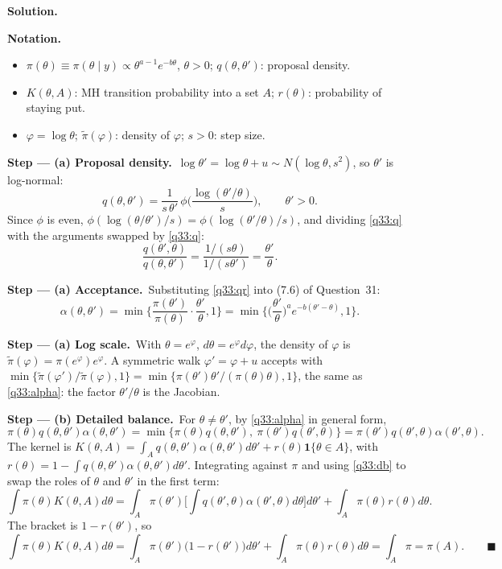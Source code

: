 \documentclass[11pt,a4paper]{article}
\numberwithin{equation}{questao}   %
\newenvironment{notacao}{\par\smallskip\noindent\textbf{Notation.}\begin{itemize}[leftmargin=1.4em,topsep=1pt,itemsep=0pt]\small}{\end{itemize}}
\newcommand{\passo}[2]{\par\smallskip\noindent\textbf{Step --- #1.}~#2}
\newcommand{\solhead}{\par\medskip\noindent{\color{blue!55!black}\rule{\linewidth}{0.3pt}}\par\noindent\textbf{Solution.}}
\newcommand{\1}{\mathbf{1}}
\begin{document}
\begin{sol}
\solhead
\begin{notacao}
\item $\pi(\theta)\equiv\pi(\theta\mid y)\propto\theta^{a-1}e^{-b\theta}$, $\theta>0$; $q(\theta,\theta')$: proposal density.
\item $K(\theta,A)$: MH transition probability into a set $A$; $r(\theta)$: probability of staying put.
\item $\varphi=\log\theta$; $\tilde\pi(\varphi)$: density of $\varphi$; $s>0$: step size.
\end{notacao}

\passo{(a) Proposal density}{$\log\theta'=\log\theta+u\sim N(\log\theta,s^2)$, so $\theta'$ is log-normal:}
\begin{equation}\label{q33:q}
q(\theta,\theta')=\frac{1}{s\,\theta'}\,\phi\Big(\frac{\log(\theta'/\theta)}{s}\Big),\qquad \theta'>0 .
\end{equation}
Since $\phi$ is even, $\phi(\log(\theta/\theta')/s)=\phi(\log(\theta'/\theta)/s)$, and dividing
\eqref{q33:q} with the arguments swapped by \eqref{q33:q}:
\begin{equation}\label{q33:qr}
\frac{q(\theta',\theta)}{q(\theta,\theta')}=\frac{1/(s\theta)}{1/(s\theta')}=\frac{\theta'}{\theta}.
\end{equation}

\passo{(a) Acceptance}{Substituting \eqref{q33:qr} into (7.6) of Question~31:}
\begin{equation}\label{q33:alpha}
\alpha(\theta,\theta')=\min\Big\{\frac{\pi(\theta')}{\pi(\theta)}\cdot\frac{\theta'}{\theta},1\Big\}
=\min\Big\{\Big(\frac{\theta'}{\theta}\Big)^{a}e^{-b(\theta'-\theta)},1\Big\}.
\end{equation}

\passo{(a) Log scale}{With $\theta=e^\varphi$, $d\theta=e^\varphi d\varphi$, the density of $\varphi$ is
$\tilde\pi(\varphi)=\pi(e^\varphi)e^{\varphi}$. A symmetric walk $\varphi'=\varphi+u$ accepts with
$\min\{\tilde\pi(\varphi')/\tilde\pi(\varphi),1\}=\min\{\pi(\theta')\theta'/(\pi(\theta)\theta),1\}$, the
same as \eqref{q33:alpha}: the factor $\theta'/\theta$ is the Jacobian.}

\passo{(b) Detailed balance}{For $\theta\ne\theta'$, by \eqref{q33:alpha} in general form,}
\begin{equation}\label{q33:db}
\pi(\theta)q(\theta,\theta')\alpha(\theta,\theta')=\min\{\pi(\theta)q(\theta,\theta'),\ \pi(\theta')q(\theta',\theta)\}
=\pi(\theta')q(\theta',\theta)\alpha(\theta',\theta).
\end{equation}
The kernel is $K(\theta,A)=\int_Aq(\theta,\theta')\alpha(\theta,\theta')d\theta'+r(\theta)\1\{\theta\in A\}$,
with $r(\theta)=1-\int q(\theta,\theta')\alpha(\theta,\theta')d\theta'$. Integrating against $\pi$ and
using \eqref{q33:db} to swap the roles of $\theta$ and $\theta'$ in the first term:
\[
\int\pi(\theta)K(\theta,A)d\theta=\int_A\pi(\theta')\Big[\int q(\theta',\theta)\alpha(\theta',\theta)d\theta\Big]d\theta'+\int_A\pi(\theta)r(\theta)d\theta .
\]
The bracket is $1-r(\theta')$, so
\[
\int\pi(\theta)K(\theta,A)d\theta=\int_A\pi(\theta')\big(1-r(\theta')\big)d\theta'+\int_A\pi(\theta)r(\theta)d\theta=\int_A\pi=\pi(A). \qquad\blacksquare
\]


\end{sol}
\end{document}
